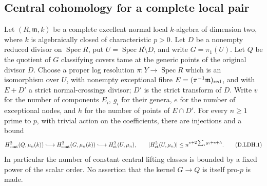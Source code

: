 \subsection{Central cohomology for a complete local pair}

\begin{lemma}
\label{D:local-divisor-tame-central-H2}
Let $(R,\mathfrak m,k)$ be a complete excellent normal local
$k$-algebra of dimension two, where $k$ is algebraically closed of
characteristic $p>0$. Let $D$ be a nonempty reduced divisor on
$\operatorname{Spec}R$, put $U=\operatorname{Spec}R\setminus D$,
and write $G=\pi_1(U)$. Let $Q$ be the quotient of $G$ classifying
covers tame at the generic points of the original divisor $D$.
Choose a proper log resolution $\pi:Y\to\operatorname{Spec}R$
which is an isomorphism over $U$, with nonempty exceptional fibre
$E=(\pi^{-1}\mathfrak m)_{\rm red}$, and with
$E+D'$ a strict normal-crossings divisor; $D'$ is the strict
transform of $D$. Write $v$ for the number of components $E_i$,
$g_i$ for their genera, $e$ for the number of exceptional nodes,
and $h$ for the number of points of $E\cap D'$.
For every $n\ge1$ prime to $p$, with trivial action on the
coefficients, there are injections and a bound
\[
 H^2_{\rm cont}(Q,\mu_n(k))\lhook\joinrel\longrightarrow
 H^2_{\rm cont}(G,\mu_n(k))\lhook\joinrel\longrightarrow
 H^2_{\rm et}(U,\mu_n),\qquad
 |H^2_{\rm et}(U,\mu_n)|\le n^{v+2\sum_i g_i+e+h}.
 \tag{D.LDH.1}
\]
In particular the number of constant central lifting classes is
bounded by a fixed power of the scalar order. No assertion that
the kernel $G\to Q$ is itself pro-$p$ is made.
\end{lemma}

